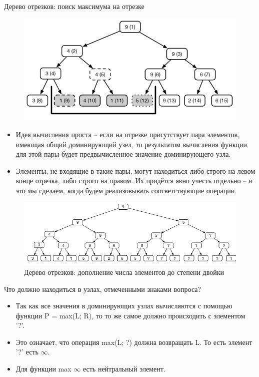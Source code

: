 \documentclass{beamer}
\begin{document}
\begin{frame}
	Дерево отрезков: поиск максимума на отрезке
	\begin{figure}[h]
		\centering
		\includegraphics[scale=0.5]{images/lec07-pic21.png}
	\end{figure}
	\begin{itemize}
		\item Идея вычисления проста -- если на отрезке присутствует пара элементов, имеющая общий доминирующий узел, то результатом вычисления функции для этой пары будет предвычисленное значение доминирующего узла. 
		\item Элементы, не входящие в такие пары, могут находиться либо строго на левом конце отрезка, либо строго на правом. Их придётся явно учесть отдельно -- и это мы сделаем, когда будем реализовывать соответствующие операции.	
	\end{itemize}
\end{frame}

\begin{frame}
	\begin{figure}[h]
		\centering
		\includegraphics[scale=0.5]{images/lec07-pic22.png}
		\caption{Дерево отрезков: дополнение числа элементов до степени двойки}
	\end{figure}
	Что должно находиться в узлах, отмеченными знаками вопроса?	
	\begin{itemize}
		\item Так как все значения в доминирующих узлах вычисляются с помощью функции P = max(L; R), то то же самое должно происходить с элементом ’?’. 
		\item Это означает, что операция max(L; ?) должна возвращать L. То есть элемент ’?’ есть $\infty$.
		\item Для функции max $\infty$ есть нейтральный элемент.	
	\end{itemize}
\end{frame}
\end{document}
